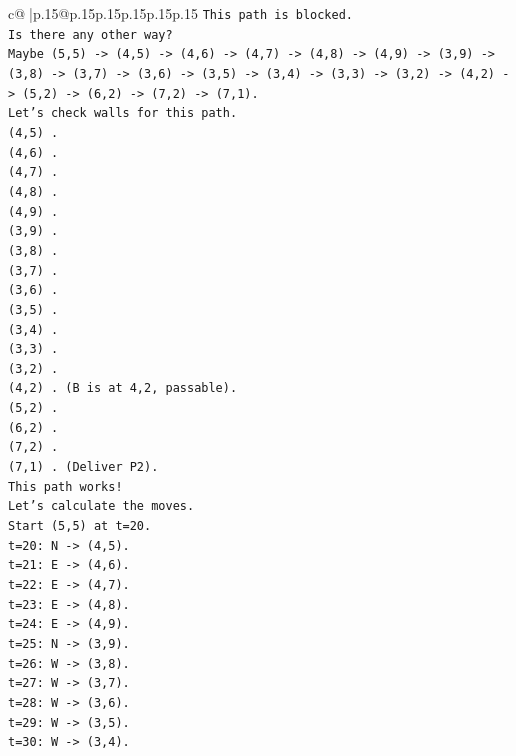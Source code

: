 \documentclass{article}
\begin{document}
{\begin{supertabular}{c@{$\;$}|p{.15\linewidth}@{}p{.15\linewidth}p{.15\linewidth}p{.15\linewidth}p{.15\linewidth}p{.15\linewidth}}
{{{\texttt{This path is blocked.} \\
\texttt{Is there any other way?} \\
\texttt{Maybe (5,5) {-}> (4,5) {-}> (4,6) {-}> (4,7) {-}> (4,8) {-}> (4,9) {-}> (3,9) {-}> (3,8) {-}> (3,7) {-}> (3,6) {-}> (3,5) {-}> (3,4) {-}> (3,3) {-}> (3,2) {-}> (4,2) {-}> (5,2) {-}> (6,2) {-}> (7,2) {-}> (7,1).} \\
\texttt{Let's check walls for this path.} \\
\texttt{(4,5) .} \\
\texttt{(4,6) .} \\
\texttt{(4,7) .} \\
\texttt{(4,8) .} \\
\texttt{(4,9) .} \\
\texttt{(3,9) .} \\
\texttt{(3,8) .} \\
\texttt{(3,7) .} \\
\texttt{(3,6) .} \\
\texttt{(3,5) .} \\
\texttt{(3,4) .} \\
\texttt{(3,3) .} \\
\texttt{(3,2) .} \\
\texttt{(4,2) . (B is at 4,2, passable).} \\
\texttt{(5,2) .} \\
\texttt{(6,2) .} \\
\texttt{(7,2) .} \\
\texttt{(7,1) . (Deliver P2).} \\
\texttt{This path works!} \\
\texttt{Let's calculate the moves.} \\
\texttt{Start (5,5) at t=20.} \\
\texttt{t=20: N {-}> (4,5).} \\
\texttt{t=21: E {-}> (4,6).} \\
\texttt{t=22: E {-}> (4,7).} \\
\texttt{t=23: E {-}> (4,8).} \\
\texttt{t=24: E {-}> (4,9).} \\
\texttt{t=25: N {-}> (3,9).} \\
\texttt{t=26: W {-}> (3,8).} \\
\texttt{t=27: W {-}> (3,7).} \\
\texttt{t=28: W {-}> (3,6).} \\
\texttt{t=29: W {-}> (3,5).} \\
\texttt{t=30: W {-}> (3,4).} \\
}}}
\end{supertabular}}
\end{document}
